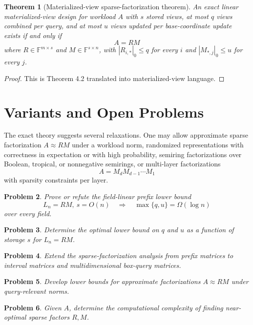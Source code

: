 \documentclass[11pt]{article}
\newtheorem{theorem}{Theorem}[section]
\newtheorem{problem}[theorem]{Problem}
\begin{document}
\begin{theorem}[Materialized-view sparse-factorization theorem]
An exact linear materialized-view design for workload $A$ with $s$ stored views, at most $q$ views combined per query, and at most $u$ views updated per base-coordinate update exists if and only if
\[
A=RM
\]
where $R\in\mathbb F^{m\times s}$ and $M\in\mathbb F^{s\times n}$, with $|R_{i,*}|_0\le q$ for every $i$ and $|M_{*,j}|_0\le u$ for every $j$.
\end{theorem}

\begin{proof}
This is Theorem 4.2 translated into materialized-view language.
\end{proof}

\section{Variants and Open Problems}

The exact theory suggests several relaxations. One may allow approximate sparse factorization $A\approx RM$ under a workload norm, randomized representations with correctness in expectation or with high probability, semiring factorizations over Boolean, tropical, or nonnegative semirings, or multi-layer factorizations
\[
A=M_dM_{d-1}\cdots M_1
\]
with sparsity constraints per layer.

\begin{problem}
Prove or refute the field-linear prefix lower bound
\[
L_n=RM,\ s=O(n)
\quad\Longrightarrow\quad
\max\{q,u\}=\Omega(\log n)
\]
over every field.
\end{problem}

\begin{problem}
Determine the optimal lower bound on $q$ and $u$ as a function of storage $s$ for $L_n=RM$.
\end{problem}

\begin{problem}
Extend the sparse-factorization analysis from prefix matrices to interval matrices and multidimensional box-query matrices.
\end{problem}

\begin{problem}
Develop lower bounds for approximate factorizations $A\approx RM$ under query-relevant norms.
\end{problem}

\begin{problem}
Given $A$, determine the computational complexity of finding near-optimal sparse factors $R,M$.
\end{problem}
\end{document}
